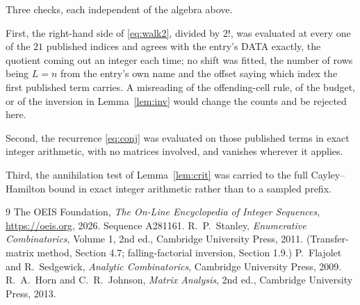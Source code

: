 \documentclass[11pt,a4paper]{article}
\theoremstyle{plain}
\theoremstyle{definition}
\begin{document}
Three checks, each independent of the algebra above.

First, the right-hand side of \eqref{eq:walk2}, divided by $2!$, was evaluated at every
one of the $21$ published indices and agrees with the entry's DATA exactly, the quotient
coming out an integer each time; no shift was fitted, the number of rows being
$L=n$ from the entry's own name and the offset saying which index the first published
term carries. A misreading of the offending-cell rule, of the budget, or of the inversion in
Lemma~\ref{lem:inv} would change the counts and be rejected here.

Second, the recurrence \eqref{eq:conj} was evaluated on those published terms in exact
integer arithmetic, with no matrices involved, and vanishes wherever it applies.

Third, the annihilation test of Lemma~\ref{lem:crit} was carried to the full
Cayley--Hamilton bound in exact integer arithmetic rather than to a sampled prefix.

\begin{thebibliography}{9}
 The OEIS Foundation, \emph{The On-Line Encyclopedia of Integer
Sequences}, \url{https://oeis.org}, 2026. Sequence A281161.
 R.~P.~Stanley, \emph{Enumerative Combinatorics}, Volume 1, 2nd ed.,
Cambridge University Press, 2011. (Transfer-matrix method, Section 4.7; falling-factorial
inversion, Section 1.9.)
 P.~Flajolet and R.~Sedgewick, \emph{Analytic Combinatorics}, Cambridge
University Press, 2009.
 R.~A.~Horn and C.~R.~Johnson, \emph{Matrix Analysis}, 2nd ed., Cambridge
University Press, 2013.
\end{thebibliography}
\end{document}
